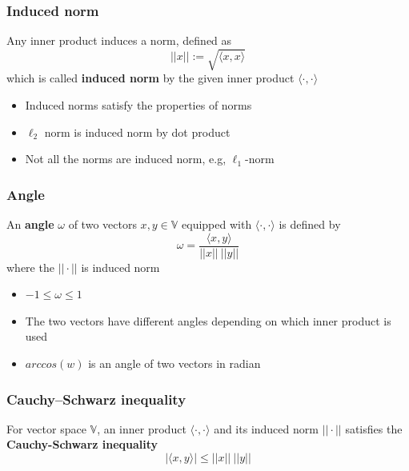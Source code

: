 \begin{frame}\frametitle{Induced norm}
    Any inner product induces a norm, defined as
    \begin{equation*}
        ||x||:=\sqrt{\langle x,x\rangle}
    \end{equation*}
    which is called \textbf{induced norm} by the given inner product $\langle\cdot,\cdot\rangle$\\
    \vspace*{10mm}
    \begin{itemize}
        \item Induced norms satisfy the properties of norms
        \item $\ell_2$ norm is induced norm by dot product
        \item Not all the norms are induced norm, e.g, $\ell_1$-norm
    \end{itemize}
\end{frame}

\begin{frame}\frametitle{Angle}
    An \textbf{angle} $\omega$ of two vectors $x,y\in\mathbb{V}$ equipped with $ \langle \cdot, \cdot \rangle$ is defined by
    \begin{equation*}
        \omega = \frac{\langle x,y\rangle}{||x||\ ||y||} 
    \end{equation*}
    where the $||\cdot||$ is induced norm
    \vspace*{10mm}
    \begin{itemize}
        \item $-1\leq\omega \leq 1 $
        \item The two vectors have different angles depending on which inner product is used
        \item $arccos(w)$ is an angle of two vectors in radian
    \end{itemize}
\end{frame}

\begin{frame}\frametitle{Cauchy–Schwarz inequality}
    For vector space $\mathbb{V}$, an inner product $\langle \cdot,\cdot \rangle$ and its induced norm $||\cdot ||$ satisfies the \textbf{Cauchy-Schwarz inequality}
    \begin{equation*}
        |\langle x,y\rangle|\leq ||x||\ ||y||
    \end{equation*}
\end{frame}

